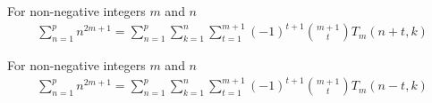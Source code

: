\begin{proposition}
    \label{prop:sum-odd-power-decomposition-forward}
    For non-negative integers $m$ and $n$
    \begin{align*}
        \sum_{n=1}^{p} n^{2m+1} = \sum_{n=1}^{p} \sum_{k=1}^{n} \sum_{t=1}^{m+1} (-1)^{t+1} \binom{m+1}{t} T_{m} (n+t, k)
    \end{align*}
\end{proposition}

\begin{proposition}
    \label{prop:sum-odd-power-decomposition-backward}
    For non-negative integers $m$ and $n$
    \begin{align*}
        \sum_{n=1}^{p} n^{2m+1} = \sum_{n=1}^{p} \sum_{k=1}^{n} \sum_{t=1}^{m+1} (-1)^{t+1} \binom{m+1}{t} T_{m} (n-t, k)
    \end{align*}
\end{proposition}

